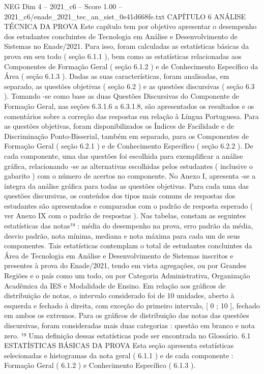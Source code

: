 \begin{textsample}{NEG Dim 4 – 2021\_c6 – Score 1.00 – 2021\_c6/enade\_2021\_tec\_an\_sist\_0e41d668fe.txt}  \label{ex:f4_neg_296}
CAPÍTULO 6 ANÁLISE TÉCNICA DA PROVA Este capítulo tem por objetivo apresentar o desempenho dos estudantes concluintes de Tecnologia em Análise e Desenvolvimento de Sistemas no Enade/2021.
Para isso, foram calculadas as estatísticas básicas da prova em seu todo ( seção 6.1.1 ), bem como as estatísticas relacionadas aos Componentes de Formação Geral ( seção 6.1.2 ) e de Conhecimento Específico da Área ( seção 6.1.3 ).
Dadas as suas características, foram analisadas, em separado, as questões objetivas ( seção 6.2 ) e as questões discursivas ( seção 6.3 ).
Tomando -se como base as duas Questões Discursivas do Componente de Formação Geral, nas seções 6.3.1.6 a 6.3.1.8, são apresentados os resultados e os comentários sobre a correção das respostas em relação à Língua Portuguesa.
Para as questões objetivas, foram disponibilizados os Índices de Facilidade e de Discriminação Ponto-Bisserial, também em separado, para os Componentes de Formação Geral ( seção 6.2.1 ) e de Conhecimento Específico ( seção 6.2.2 ).
De cada componente, uma das questões foi escolhida para exemplificar a análise gráfica, relacionando -se as alternativas escolhidas pelos estudantes ( inclusive o gabarito ) com o número de acertos no componente.
No Anexo I, apresenta -se a íntegra da análise gráfica para todas as questões objetivas.
Para cada uma das questões discursivas, os conteúdos dos tipos mais comuns de respostas dos estudantes são apresentados e comparados com o padrão de resposta esperado ( ver Anexo IX com o padrão de respostas ).
Nas tabelas, constam as seguintes estatísticas das notas¹⁹ : média do desempenho na prova, erro padrão da média, desvio padrão, nota mínima, mediana e nota máxima para cada um de seus componentes.
Tais estatísticas contemplam o total de estudantes concluintes da Área de Tecnologia em Análise e Desenvolvimento de Sistemas inscritos e presentes à prova do Enade/2021, tendo em vista agregações, ou por Grandes Regiões e o país como um todo, ou por Categoria Administrativa, Organização Acadêmica da IES e Modalidade de Ensino.
Em relação aos gráficos de distribuição de notas, o intervalo considerado foi de 10 unidades, aberto à esquerda e fechado à direita, com exceção do primeiro intervalo, [ 0 ; 10 ], fechado em ambos os extremos.
Para os gráficos de distribuição das notas das questões discursivas, foram consideradas mais duas categorias : questão em branco e nota zero. ¹⁹ Uma definição dessas estatísticas pode ser encontrada no Glossário. 6.1 ESTATÍSTICAS BÁSICAS DA PROVA Esta seção apresenta estatísticas selecionadas e histogramas da nota geral ( 6.1.1 ) e de cada componente : Formação Geral ( 6.1.2 ) e Conhecimento Específico ( 6.1.3 ).

\end{textsample}
